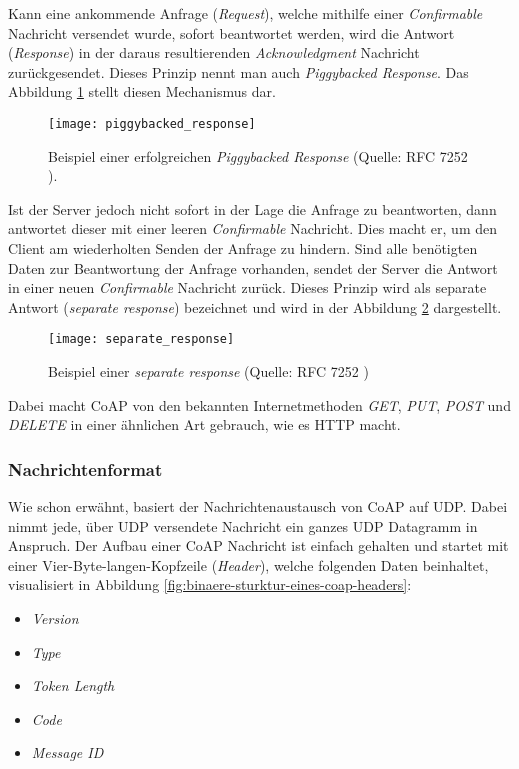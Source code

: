 Kann eine ankommende Anfrage (\textit{Request}), welche mithilfe einer \textit{Confirmable} Nachricht versendet wurde, sofort beantwortet werden, wird die Antwort (\textit{Response}) in der daraus resultierenden \textit{Acknowledgment} Nachricht zurückgesendet. Dieses Prinzip nennt man auch \textit{Piggybacked Response}. Das Abbildung \ref{fig:beispiel-eines-erfolgreichen-piggybacked-response} stellt diesen Mechanismus dar.

\begin{figure}[h]
    \centering
    \texttt{[image: piggybacked\_response]}
    \caption{Beispiel einer erfolgreichen \textit{Piggybacked Response} (Quelle: RFC 7252 \cite{RFC7252}).}
    \label{fig:beispiel-eines-erfolgreichen-piggybacked-response}
\end{figure}

Ist der Server jedoch nicht sofort in der Lage die Anfrage zu beantworten, dann antwortet dieser mit einer leeren \textit{Confirmable} Nachricht. Dies macht er, um den Client am wiederholten Senden der Anfrage zu hindern. Sind alle benötigten Daten zur Beantwortung der Anfrage vorhanden, sendet der Server die Antwort in einer neuen \textit{Confirmable} Nachricht zurück. Dieses Prinzip wird als separate Antwort (\textit{separate response}) bezeichnet und wird in der Abbildung \ref{fig:beispiel-einer-separate-response} dargestellt.

\begin{figure}[h]
    \centering
    \texttt{[image: separate\_response]}
    \caption{Beispiel einer \textit{separate response} (Quelle: RFC 7252 \cite{RFC7252})}
    \label{fig:beispiel-einer-separate-response}
\end{figure}

Dabei macht CoAP von den bekannten Internetmethoden \textit{GET}, \textit{PUT}, \textit{POST} und \textit{DELETE} in einer ähnlichen Art gebrauch, wie es HTTP macht.

\subsubsection{Nachrichtenformat}
\label{subsubsec:nachrichtenformat}

Wie schon erwähnt, basiert der Nachrichtenaustausch von CoAP auf UDP. Dabei nimmt jede, über UDP versendete Nachricht ein ganzes UDP Datagramm in Anspruch. Der Aufbau einer CoAP Nachricht ist einfach gehalten und startet mit einer Vier-Byte-langen-Kopfzeile (\textit{Header}), welche folgenden Daten beinhaltet, visualisiert in Abbildung \ref{fig:binaere-sturktur-eines-coap-headers}:
\begin{itemize}
    \item \textit{Version}
    \item \textit{Type}
    \item \textit{Token Length}
    \item \textit{Code}
    \item \textit{Message ID}
\end{itemize}

